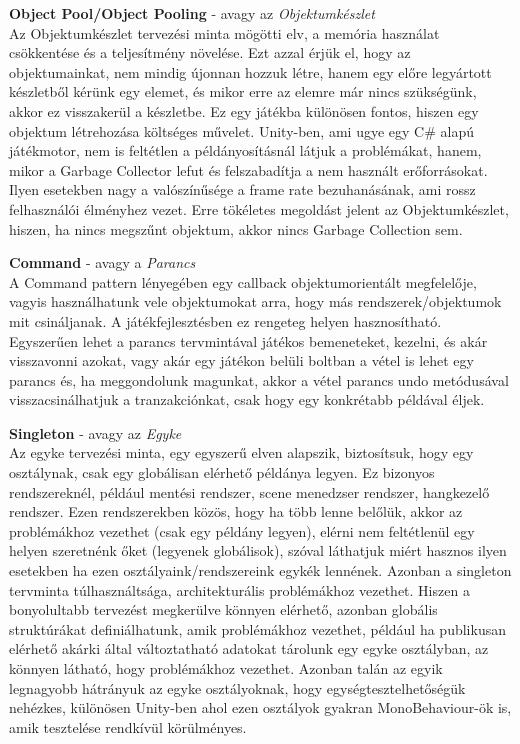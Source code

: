 \textbf{Object Pool/Object Pooling} - avagy az \textit{Objektumkészlet}\\
Az Objektumkészlet tervezési minta mögötti elv, a memória használat csökkentése és a teljesítmény növelése. Ezt azzal érjük el, hogy az objektumainkat, nem mindig újonnan hozzuk létre, hanem  egy előre legyártott készletből kérünk egy elemet, és mikor erre az elemre már nincs szükségünk, akkor ez visszakerül a készletbe. Ez egy játékba különösen fontos, hiszen egy objektum létrehozása költséges művelet. Unity-ben, ami ugye egy C\# alapú játékmotor, nem is feltétlen a példányosításnál látjuk a problémákat, hanem, mikor a Garbage Collector lefut és felszabadítja a nem használt erőforrásokat. Ilyen esetekben nagy a valószínűsége a frame rate bezuhanásának, ami rossz felhasználói élményhez vezet. Erre tökéletes megoldást jelent az Objektumkészlet, hiszen, ha nincs megszűnt objektum, akkor nincs Garbage Collection sem.

\textbf{Command} - avagy a \textit{Parancs}\\
A Command pattern lényegében egy callback objektumorientált megfelelője, vagyis használhatunk vele objektumokat arra, hogy más rendszerek/objektumok mit csináljanak. A játékfejlesztésben ez rengeteg helyen hasznosítható. Egyszerűen lehet a parancs tervmintával játékos bemeneteket, kezelni, és akár visszavonni azokat, vagy akár egy játékon belüli boltban a vétel is lehet egy parancs és, ha meggondolunk magunkat, akkor a vétel parancs undo metódusával visszacsinálhatjuk a tranzakciónkat, csak hogy egy konkrétabb példával éljek.

\textbf{Singleton} - avagy az \textit{Egyke}\\
Az egyke tervezési minta, egy egyszerű elven alapszik, biztosítsuk, hogy egy osztálynak, csak egy globálisan elérhető példánya legyen. Ez bizonyos rendszereknél, például mentési rendszer, scene menedzser rendszer, hangkezelő rendszer. Ezen rendszerekben közös, hogy ha több lenne belőlük, akkor az problémákhoz vezethet (csak egy példány legyen), elérni nem feltétlenül egy helyen szeretnénk őket (legyenek globálisok), szóval láthatjuk miért hasznos ilyen esetekben ha ezen osztályaink/rendszereink egykék lennének. Azonban a singleton tervminta túlhasználtsága, architekturális problémákhoz vezethet. Hiszen a bonyolultabb tervezést megkerülve könnyen elérhető, azonban globális struktúrákat definiálhatunk, amik problémákhoz vezethet, például ha publikusan elérhető akárki által változtatható adatokat tárolunk egy egyke osztályban, az könnyen látható, hogy problémákhoz vezethet. Azonban talán az egyik legnagyobb hátrányuk az egyke osztályoknak, hogy egységtesztelhetőségük nehézkes, különösen Unity-ben ahol ezen osztályok gyakran MonoBehaviour-ök is, amik tesztelése rendkívül körülményes.

